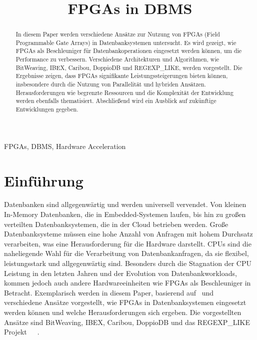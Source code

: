 \documentclass[conference]{IEEEtran}
\begin{document}

\title{FPGAs in DBMS
}

\author{
}

\maketitle

\begin{abstract}
    In diesem Paper werden verschiedene Ansätze zur Nutzung von FPGAs (Field Programmable Gate Arrays) in Datenbanksystemen untersucht.
    Es wird gezeigt, wie FPGAs als Beschleuniger für Datenbankoperationen eingesetzt werden können, um die Performance zu verbessern.
    Verschiedene Architekturen und Algorithmen, wie BitWeaving, IBEX, Caribou, DoppioDB und REGEXP\_LIKE, werden vorgestellt.
    Die Ergebnisse zeigen, dass FPGAs signifikante Leistungssteigerungen bieten können, insbesondere durch
    die Nutzung von Parallelität und hybriden Ansätzen. Herausforderungen wie begrenzte Ressourcen und die Komplexität der Entwicklung
    werden ebenfalls thematisiert. Abschließend wird ein Ausblick auf zukünftige Entwicklungen gegeben.
\end{abstract}

\begin{IEEEkeywords}
    FPGAs, DBMS, Hardware Acceleration
\end{IEEEkeywords}

\section{Einführung}
Datenbanken sind allgegenwärtig und werden universell vervendet. Von kleinen In-Memory Datenbanken, die in Embedded-Systemen laufen, bis
hin zu großen verteilten Datenbanksystemen, die in der Cloud betrieben werden. Große Datenbanksysteme müssen eine hohe Anzahl von Anfragen
mit hohem Durchsatz verarbeiten, was eine Herausforderung für die Hardware darstellt. CPUs sind die naheliegende Wahl für die Verarbeitung
von Datenbankanfragen, da sie flexibel, leistungsstark und allgegenwärtig sind. Besonders durch die Stagnation der CPU Leistung in den letzten Jahren
und der Evolution von Datenbankworkloads, kommen jedoch auch andere Hardwareeinheiten wie FPGAs als Beschleuniger in Betracht. Exemplarisch
werden in diesem Paper, basierend auf~\cite{lisa_column_2018} und~\cite{istvan_glass_2019} verschiedene Ansätze vorgestellt, wie FPGAs in Datenbanksystemen
eingesetzt werden können und welche Herausforderungen
sich ergeben. Die vorgestellten Ansätze sind BitWeaving, IBEX, Caribou, DoppioDB und das REGEXP\_LIKE Projekt~\cite{lisa_column_2018}~\cite{istvan_glass_2019}~\cite{li_bitweaving_2013}.
\end{document}
